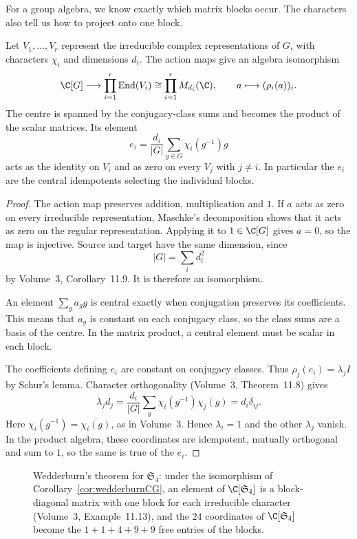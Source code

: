 For a group algebra, we know exactly which matrix blocks occur. The characters also tell us how to project onto one block.

\begin{corollary}\label{cor:wedderburnCG}
Let $V_1,\ldots,V_r$ represent the irreducible complex representations of $G$, with characters $\chi_i$ and dimensions $d_i$. The action maps give an algebra isomorphism
\[
\C[G]\longrightarrow\prod_{i=1}^r\operatorname{End}(V_i)
\cong\prod_{i=1}^rM_{d_i}(\C),\qquad
 a\longmapsto(\rho_i(a))_i.
\]
The centre is spanned by the conjugacy-class sums and becomes the product of the scalar matrices. Its element
\[
e_i=\frac{d_i}{|G|}\sum_{g\in G}\chi_i(g^{-1})g
\]
acts as the identity on $V_i$ and as zero on every $V_j$ with $j\ne i$. In particular the $e_i$ are the central idempotents selecting the individual blocks.
\end{corollary}

\begin{proof}
The action map preserves addition, multiplication and $1$. If $a$ acts as zero on every irreducible representation, Maschke's decomposition shows that it acts as zero on the regular representation. Applying it to $1\in\C[G]$ gives $a=0$, so the map is injective. Source and target have the same dimension, since
\[
|G|=\sum_i d_i^2
\]
by Volume~3, Corollary~11.9. It is therefore an isomorphism.

An element $\sum_ga_gg$ is central exactly when conjugation preserves its coefficients. This means that $a_g$ is constant on each conjugacy class, so the class sums are a basis of the centre. In the matrix product, a central element must be scalar in each block.

The coefficients defining $e_i$ are constant on conjugacy classes. Thus $\rho_j(e_i)=\lambda_jI$ by Schur's lemma. Character orthogonality (Volume~3, Theorem~11.8) gives
\[
\lambda_jd_j
=\frac{d_i}{|G|}\sum_g\chi_i(g^{-1})\chi_j(g)
=d_i\delta_{ij}.
\]
Here $\chi_i(g^{-1})=\overline{\chi_i(g)}$, as in Volume~3. Hence $\lambda_i=1$ and the other $\lambda_j$ vanish. In the product algebra, these coordinates are idempotent, mutually orthogonal and sum to $1$, so the same is true of the $e_i$.
\end{proof}

\begin{figure}[ht]
\centering
{}
\caption{Wedderburn's theorem for $\mathfrak S_4$: under the isomorphism of Corollary~\ref{cor:wedderburnCG}, an element of $\C[\mathfrak S_4]$ is a block-diagonal matrix with one block for each irreducible character (Volume~3, Example~11.13), and the
$24$ coordinates of $\C[\mathfrak S_4]$ become the $1+1+4+9+9$ free entries of the blocks.}
\label{fig:wedderburn}
\end{figure}

